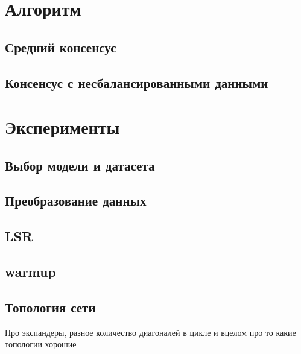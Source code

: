 \documentclass[a4paper,article,14pt]{extarticle}
\begin{document}
\pagebreak
\section{Алгоритм}
\subsection{Средний консенсус}
\subsection{Консенсус с несбалансированными данными}

\section{Эксперименты}
\subsection{Выбор модели и датасета}
\subsection{Преобразование данных}
\subsection{LSR}
\subsection{warmup}
\subsection{Топология сети}
Про экспандеры, разное количество диагоналей в цикле и вцелом про то какие топологии хорошие
\end{document}
